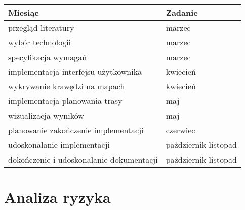 \renewcommand{\arraystretch}{1.5}
\begin{tabular}{ | p{8cm} | p{4cm}| } 
  \hline
  \textbf{Miesiąc} & \textbf{Zadanie} \\
  \hline
  przegląd literatury & marzec \\ 
  \hline
  wybór technologii & marzec \\ 
  \hline
  specyfikacja wymagań & marzec \\ 
  \hline
  implementacja interfejsu użytkownika & kwiecień \\
  \hline
  wykrywanie krawędzi na mapach & kwiecień \\
  \hline
  implementacja planowania trasy & maj \\
  \hline
  wizualizacja wyników & maj \\
  \hline
  planowanie zakończenie implementacji & czerwiec \\
  \hline
  udoskonalanie implementacji & październik-listopad \\ 
  \hline
  dokończenie i udoskonalanie dokumentacji & październik-listopad \\
  \hline
  
\end{tabular}

\section{Analiza ryzyka}

